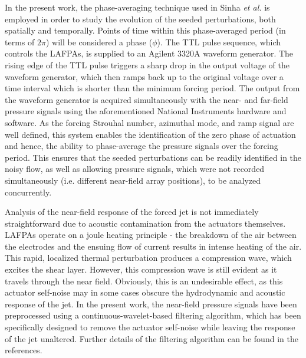 \documentclass[english]{aiaa-tc}
\begin{document}
In the present work, the phase-averaging technique used in Sinha {\em et al.}\cite{sinha2013} is employed in order to study the evolution of the seeded perturbations, both spatially and temporally. Points of time within this phase-averaged period (in terms of $2\pi$) will be considered a phase ($\phi$). The TTL pulse sequence, which controls the LAFPAs, is supplied to an Agilent 3320A waveform generator. The rising edge of the TTL pulse triggers a sharp drop in the output voltage of the waveform generator, which then ramps back up to the original voltage over a time interval which is shorter than the minimum forcing period. The output from the waveform generator is acquired simultaneously with the near- and far-field pressure signals using the aforementioned National Instruments hardware and software. As the forcing Strouhal number, azimuthal mode, and ramp signal are well defined, this system enables the identification of the zero phase of actuation and hence, the ability to phase-average the pressure signals over the forcing period. This ensures that the seeded perturbations can be readily identified in the noisy flow, as well as allowing pressure signals, which were not recorded simultaneously (i.e. different near-field array positions), to be analyzed concurrently. 

Analysis of the near-field response of the forced jet is not immediately straightforward due to acoustic contamination from the actuators themselves\cite{sinha2013}. LAFPAs operate on a joule heating principle - the breakdown of the air between the electrodes and the ensuing flow of current results in intense heating of the air. This rapid, localized thermal perturbation produces a compression wave, which excites the shear layer. However, this compression wave is still evident as it travels through the near field. Obviously, this is an undesirable effect, as this actuator self-noise may in some cases obscure the hydrodynamic and acoustic response of the jet. In the present work, the near-field pressure signals have been preprocessed using a continuous-wavelet-based filtering algorithm, which has been specifically designed to remove the actuator self-noise while leaving the response of the jet unaltered. Further details of the filtering algorithm can be found in the references\cite{Alkandry2013}. 
\end{document}
